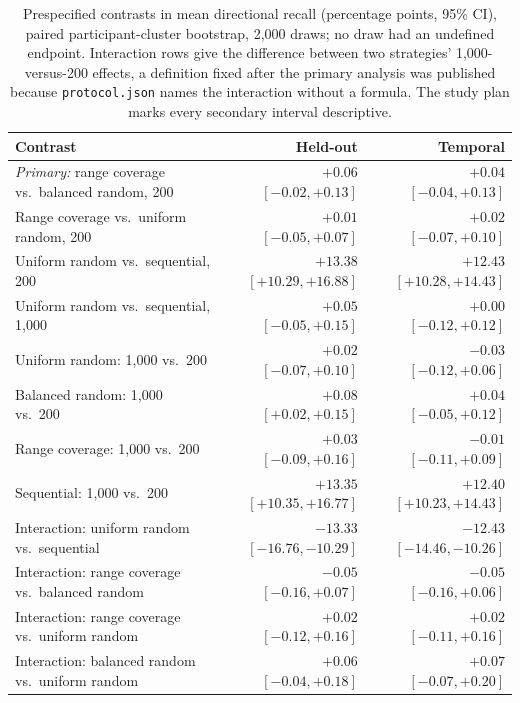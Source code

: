 \documentclass[10pt,twocolumn]{article}
\begin{document}
\begin{table}[t]
\centering
\caption{Prespecified contrasts in mean directional recall (percentage
points, 95\% CI), paired participant-cluster bootstrap, 2,000 draws; no
draw had an undefined endpoint. Interaction rows give the difference
between two strategies' 1,000-versus-200 effects, a definition fixed after
the primary analysis was published because \texttt{protocol.json} names
the interaction without a formula. The study plan marks every secondary
interval descriptive.}
\label{tab:contrasts}
\small
\begin{tabular}{@{}lrr@{}}
\toprule
Contrast & Held-out & Temporal \\
\midrule
\emph{Primary:} range coverage vs.\ balanced random, 200 & $+0.06$ $[-0.02, +0.13]$ & $+0.04$ $[-0.04, +0.13]$ \\
Range coverage vs.\ uniform random, 200 & $+0.01$ $[-0.05, +0.07]$ & $+0.02$ $[-0.07, +0.10]$ \\
Uniform random vs.\ sequential, 200 & $+13.38$ $[+10.29, +16.88]$ & $+12.43$ $[+10.28, +14.43]$ \\
Uniform random vs.\ sequential, 1,000 & $+0.05$ $[-0.05, +0.15]$ & $+0.00$ $[-0.12, +0.12]$ \\
\midrule
Uniform random: 1,000 vs.\ 200 & $+0.02$ $[-0.07, +0.10]$ & $-0.03$ $[-0.12, +0.06]$ \\
Balanced random: 1,000 vs.\ 200 & $+0.08$ $[+0.02, +0.15]$ & $+0.04$ $[-0.05, +0.12]$ \\
Range coverage: 1,000 vs.\ 200 & $+0.03$ $[-0.09, +0.16]$ & $-0.01$ $[-0.11, +0.09]$ \\
Sequential: 1,000 vs.\ 200 & $+13.35$ $[+10.35, +16.77]$ & $+12.40$ $[+10.23, +14.43]$ \\
\midrule
Interaction: uniform random vs.\ sequential & $-13.33$ $[-16.76, -10.29]$ & $-12.43$ $[-14.46, -10.26]$ \\
Interaction: range coverage vs.\ balanced random & $-0.05$ $[-0.16, +0.07]$ & $-0.05$ $[-0.16, +0.06]$ \\
Interaction: range coverage vs.\ uniform random & $+0.02$ $[-0.12, +0.16]$ & $+0.02$ $[-0.11, +0.16]$ \\
Interaction: balanced random vs.\ uniform random & $+0.06$ $[-0.04, +0.18]$ & $+0.07$ $[-0.07, +0.20]$ \\
\bottomrule
\end{tabular}
\end{table}
\end{document}
